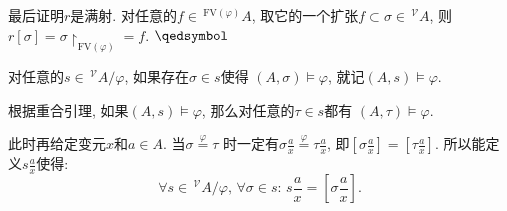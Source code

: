 \documentclass[UTF8]{ctexart}
\begin{document}
最后证明$r$是满射. 对任意的$f\in\,\!^{\mathrm{FV}(\varphi)}A$,
取它的一个扩张$f\subset\sigma\in\,\!^{\mathcal{V}}\!A$,
则$r[\sigma]=\sigma\!\restriction_{\mathrm{FV}(\varphi)}=f$. \hfill $\qedsymbol$

\vspace{10pt}

对任意的$s\in\,\!^{\mathcal{V}}\!A/\varphi$, 如果存在$\sigma\in s$使得
$(A,\sigma)\models\varphi$, 就记$(A,s)\models\varphi$.

根据重合引理, 如果$(A,s)\models\varphi$, 那么对任意的$\tau\in s$都有
$(A,\tau)\models\varphi$.

\vspace{10pt}

此时再给定变元$x$和$a\in A$. 当$\sigma\overset{\displaystyle\varphi}{=}\tau$
时一定有$\displaystyle\sigma\frac{a}{x}\overset{\displaystyle\varphi}{=}
\tau\frac{a}{x}$, 即$\displaystyle\left[\sigma\frac{a}{x}\right]=
\left[\tau\frac{a}{x}\right]$. 所以能定义$\displaystyle s\frac{a}{x}$使得:
\vspace{6pt}
\[
    \forall s\in\,\!^{\mathcal{V}}\!A/\varphi,\,\forall\sigma\in s:\,
    s\frac{a}{x}=\left[\sigma\frac{a}{x}\right].
\]
\end{document}
